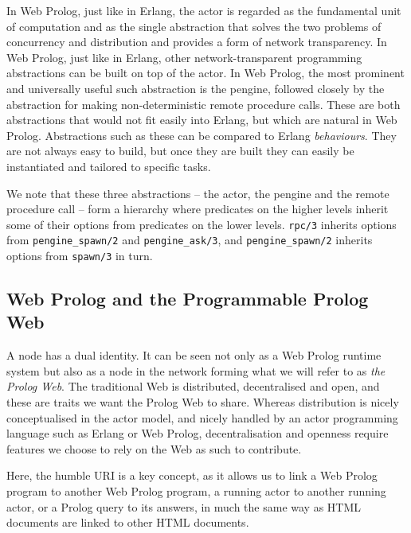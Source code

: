\documentclass{tlp}
\begin{document}
\noindent In Web Prolog, just like in Erlang, the actor is regarded as the fundamental unit of computation and as the single abstraction that solves the two problems of concurrency and distribution and provides a form of network transparency. In Web Prolog, just like in Erlang, other network-transparent programming abstractions can be built on top of the actor. In Web Prolog, the most prominent and universally useful such abstraction is the pengine, followed closely by the abstraction for making non-deterministic remote procedure calls. These are both abstractions that would not fit easily into Erlang, but which are natural in Web Prolog. Abstractions such as these can be compared to Erlang \textit{behaviours}. They are not always easy to build, but once they are built they can easily be instantiated and tailored to specific tasks. 

We note that these three abstractions -- the actor, the pengine and the remote procedure call -- form a hierarchy where predicates on the higher levels inherit some of their options from predicates on the lower levels. \texttt{rpc/3} inherits options from \texttt{pengine\_spawn/2} and \texttt{pengine\_ask/3}, and \texttt{pengine\_spawn/2} inherits options from \texttt{spawn/3} in turn. 



%


\subsection{Web Prolog and the Programmable Prolog Web}\label{sec:for-erlangers-2}

\noindent A node has a dual identity. It can be seen not only as a Web Prolog runtime system but also as a node in the network forming what we will refer to as \textit{the Prolog Web}. The traditional Web is distributed, decentralised and open, and these are traits we want the Prolog Web to share. Whereas distribution is nicely conceptualised in the actor model, and nicely handled by an actor programming language such as Erlang or Web Prolog, decentralisation and openness require features we choose to rely on the Web as such to contribute.

Here, the humble URI is a key concept, as it allows us to link a Web Prolog program to another Web Prolog program, a running actor to another running actor, or a Prolog query to its answers, in much the same way as HTML documents are linked to other HTML documents.
\end{document}

